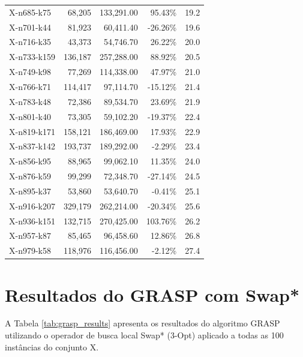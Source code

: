 \documentclass[12pt,a4paper]{article}
\begin{document}
\begin{longtable}{@{}lrrrr@{}}
    X-n685-k75 & 68,205 & 133,291.00 & 95.43\% & 19.2 \\
    X-n701-k44 & 81,923 & 60,411.40 & -26.26\% & 19.6 \\
    X-n716-k35 & 43,373 & 54,746.70 & 26.22\% & 20.0 \\
    X-n733-k159 & 136,187 & 257,288.00 & 88.92\% & 20.5 \\
    X-n749-k98 & 77,269 & 114,338.00 & 47.97\% & 21.0 \\
    X-n766-k71 & 114,417 & 97,114.70 & -15.12\% & 21.4 \\
    X-n783-k48 & 72,386 & 89,534.70 & 23.69\% & 21.9 \\
    X-n801-k40 & 73,305 & 59,102.20 & -19.37\% & 22.4 \\
    X-n819-k171 & 158,121 & 186,469.00 & 17.93\% & 22.9 \\
    X-n837-k142 & 193,737 & 189,292.00 & -2.29\% & 23.4 \\
    X-n856-k95 & 88,965 & 99,062.10 & 11.35\% & 24.0 \\
    X-n876-k59 & 99,299 & 72,348.70 & -27.14\% & 24.5 \\
    X-n895-k37 & 53,860 & 53,640.70 & -0.41\% & 25.1 \\
    X-n916-k207 & 329,179 & 262,214.00 & -20.34\% & 25.6 \\
    X-n936-k151 & 132,715 & 270,425.00 & 103.76\% & 26.2 \\
    X-n957-k87 & 85,465 & 96,458.60 & 12.86\% & 26.8 \\
    X-n979-k58 & 118,976 & 116,456.00 & -2.12\% & 27.4 \\
\end{longtable}

\clearpage

\section{Resultados do GRASP com Swap*}

A Tabela \ref{tab:grasp_results} apresenta os resultados do algoritmo GRASP utilizando o operador de busca local Swap* (3-Opt) aplicado a todas as 100 instâncias do conjunto X.
\end{document}
